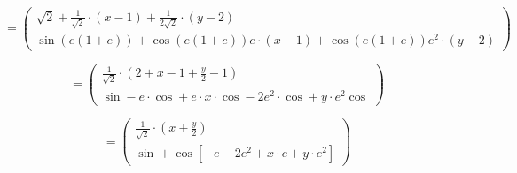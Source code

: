 \documentclass[ngerman, a4paper]{scrartcl}
\begin{document}
	\[
		=
		\begin{pmatrix}
			\sqrt{2} + \frac{1}{\sqrt{2}}\cdot(x-1) + \frac{1}{2\sqrt{2}}\cdot(y-2)\\
			\sin(e(1 + e)) + \cos(e(1 + e))e\cdot(x-1) + \cos(e(1 + e))e^2\cdot(y-2)
		\end{pmatrix}
	\]
	
	\[
		=
		\begin{pmatrix}
			\frac{1}{\sqrt{2}}\cdot(2+x-1+\frac{y}{2}-1)\\
			\sin -e\cdot\cos + e\cdot x\cdot \cos -2e^2\cdot \cos + y \cdot e^2 \cos
		\end{pmatrix}
	\]
	
	\[
	=
	\begin{pmatrix}
		\frac{1}{\sqrt{2}}\cdot(x+\frac{y}{2})\\
		\sin + \cos\left[-e - 2e^2 + x\cdot e + y\cdot e^2 \right] 
	\end{pmatrix}
	\]
	
\end{document}
